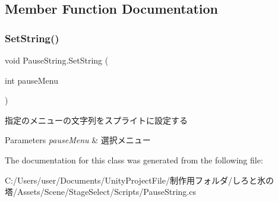 \subsection{Member Function Documentation}
\mbox{\label{class_pause_string_aeec0a41f36a344cac3b5592e177cd463}} 
\subsubsection{\texorpdfstring{Set\+String()}{SetString()}}
{\footnotesize\ttfamily void Pause\+String.\+Set\+String (\begin{DoxyParamCaption}\item[{int}]{pause\+Menu }\end{DoxyParamCaption})\hspace{0.3cm}{\ttfamily [inline]}}



指定のメニューの文字列をスプライトに設定する 


\begin{DoxyParams}{Parameters}
{\em pause\+Menu} & 選択メニュー\\
\hline
\end{DoxyParams}


The documentation for this class was generated from the following file\+:\begin{DoxyCompactItemize}
\item 
C\+:/\+Users/user/\+Documents/\+Unity\+Project\+File/制作用フォルダ/しろと氷の塔/\+Assets/\+Scene/\+Stage\+Select/\+Scripts/Pause\+String.\+cs\end{DoxyCompactItemize}
